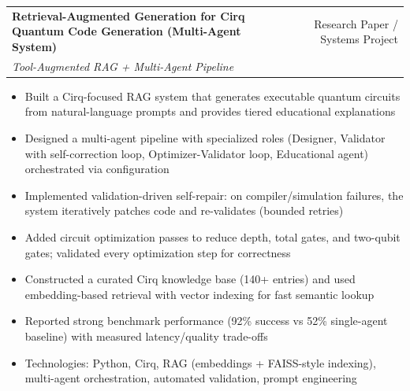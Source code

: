 \documentclass[a4paper,12pt]{article}
\makeatletter
\newenvironment{projectdetailed}[3]
    {
    \begin{tabularx}{\linewidth}{@{}l X r@{}}
    \textbf{#1} & \hfill & #2 \\
    \textit{#3} & & \\[3.75pt]
    \end{tabularx}
    \begin{minipage}[t]{\linewidth}
    \begin{itemize}[nosep,after=\strut, leftmargin=1em, itemsep=2pt,label=--]
    }
    {
    \end{itemize}
    \end{minipage}
    \vspace{6pt}
    }
\makeatother
\begin{document}
\begin{projectdetailed}{Retrieval-Augmented Generation for Cirq Quantum Code Generation (Multi-Agent System)}{Research Paper / Systems Project}{Tool-Augmented RAG + Multi-Agent Pipeline}
\item Built a Cirq-focused RAG system that generates executable quantum circuits from natural-language prompts and provides tiered educational explanations
\item Designed a multi-agent pipeline with specialized roles (Designer, Validator with self-correction loop, Optimizer-Validator loop, Educational agent) orchestrated via configuration
\item Implemented validation-driven self-repair: on compiler/simulation failures, the system iteratively patches code and re-validates (bounded retries)
\item Added circuit optimization passes to reduce depth, total gates, and two-qubit gates; validated every optimization step for correctness
\item Constructed a curated Cirq knowledge base (140+ entries) and used embedding-based retrieval with vector indexing for fast semantic lookup
\item Reported strong benchmark performance (92\% success vs 52\% single-agent baseline) with measured latency/quality trade-offs
\item Technologies: Python, Cirq, RAG (embeddings + FAISS-style indexing), multi-agent orchestration, automated validation, prompt engineering
\end{projectdetailed}
\end{document}
